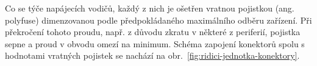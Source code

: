         Co se týče napájecích vodičů, každý z nich je ošetřen vratnou pojistkou (ang. polyfuse) dimenzovanou podle předpokládaného maximálního odběru zařízení. Při překročení tohoto proudu, např. z důvodu zkratu v některé z periferií, pojistka sepne a proud v obvodu omezí na minimum. Schéma zapojení konektorů spolu s hodnotami vratných pojistek se nachází na obr.~\ref{fig:ridici-jednotka-konektory}.


            